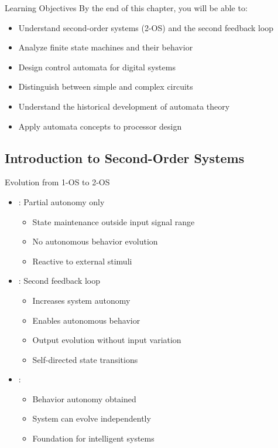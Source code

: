 
\begin{frame}{Learning Objectives}
By the end of this chapter, you will be able to:
\begin{itemize}
\item Understand second-order systems (2-OS) and the second feedback loop
\item Analyze finite state machines and their behavior
\item Design control automata for digital systems
\item Distinguish between simple and complex circuits
\item Understand the historical development of automata theory
\item Apply automata concepts to processor design
\end{itemize}
\end{frame}

\subsection{Introduction to Second-Order Systems}

\begin{frame}{Evolution from 1-OS to 2-OS}
\begin{itemize}
\item {}: Partial autonomy only
\begin{itemize}
\item State maintenance outside input signal range
\item No autonomous behavior evolution
\item Reactive to external stimuli
\end{itemize}
\vspace{0.5cm}
\item {}: Second feedback loop
\begin{itemize}
\item Increases system autonomy
\item Enables autonomous behavior
\item Output evolution without input variation
\item Self-directed state transitions
\end{itemize}
\vspace{0.3cm}
\item {}: 
\begin{itemize}
\item Behavior autonomy obtained
\item System can evolve independently
\item Foundation for intelligent systems
\end{itemize}
\end{itemize}
\end{frame}

